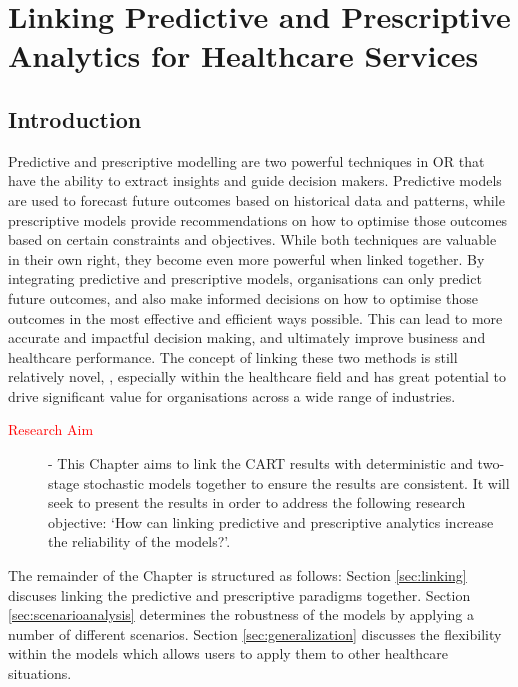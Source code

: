 \documentclass[../thesis.tex]{subfiles}
\begin{document}
\chapter{Linking Predictive and Prescriptive Analytics for Healthcare Services}\label{chp:Linking}

\section{Introduction}
Predictive and prescriptive modelling are two powerful techniques in OR that have the ability to extract insights and guide decision makers. Predictive models are used to forecast future outcomes based on historical data and patterns, while prescriptive models provide recommendations on how to optimise those outcomes based on certain constraints and objectives. While both techniques are valuable in their own right, they become even more powerful when linked together. By integrating predictive and prescriptive models, organisations can only predict future outcomes, and also make informed decisions on how to optimise those outcomes in the most effective and efficient ways possible. This can lead to more accurate and impactful decision making, and ultimately improve business and healthcare performance. The concept of linking these two methods is still relatively novel, \cite{Lopes2020,Williams2022}, especially within the healthcare field and has great potential to drive significant value for organisations across a wide range of industries.

\begin{description}
\item[\textcolor{red}{Research Aim}] - This Chapter aims to link the CART results with deterministic and two-stage stochastic models together to ensure the results are consistent. It will seek to present the results in order to address the following research objective: `How can linking predictive and prescriptive analytics increase the reliability of the models?'.
\end{description}

The remainder of the Chapter is structured as follows: Section \ref{sec:linking} discuses linking the predictive and prescriptive paradigms together. Section \ref{sec:scenarioanalysis} determines the robustness of the models by applying a number of different scenarios. Section \ref{sec:generalization} discusses the flexibility within the models which allows users to apply them to other healthcare situations.

\end{document}
